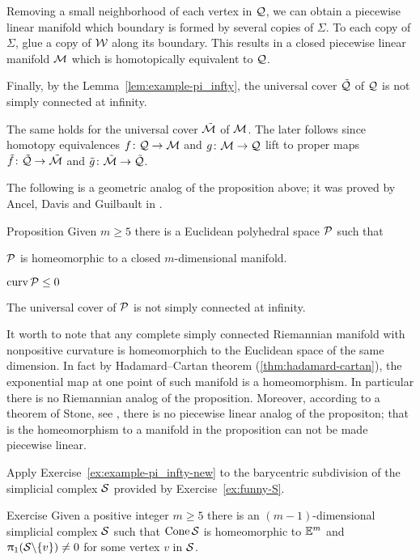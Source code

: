 Removing a small neighborhood of each vertex in $\mathcal{Q}$,
we can obtain a piecewise linear manifold 
which boundary is formed by several copies of $\Sigma$.
To each copy of $\Sigma$, 
glue a copy of  $\mathcal{W}$ along its boundary.
This results in a  closed piecewise linear manifold 
$\mathcal{M}$ which is homotopically equivalent to $\mathcal{Q}$.

Finally, by the Lemma~\ref{lem:example-pi_infty},  
the universal cover $\tilde{\mathcal{Q}}$ of $\mathcal{Q}$
is not simply connected at infinity.

The same holds for 
the universal cover $\tilde{\mathcal{M}}$ of $\mathcal{M}$.
The later follows since homotopy equivalences 
$f\: \spc Q\to \spc M$ and $g\:\spc M\to \spc Q$ 
lift to proper maps 
$\tilde f \: \tilde{\spc{Q}}\to \tilde{\spc{M}}$
and $\tilde g \: \tilde{\spc{M}}\to \tilde{\spc{Q}}$. 
\qeds

The following is a geometric analog of the proposition above;
it was proved by Ancel, Davis and Guilbault in \cite{ADG}. 


\begin{thm}{Proposition}\label{prop:loc-CAT-mnfld}
Given $m\ge 5$ there is a Euclidean polyhedral space $\mathcal{P}$ such that
\begin{subthm}{}
$\mathcal{P}$ is homeomorphic to a closed $m$-dimensional manifold.
\end{subthm}

\begin{subthm}{}
$\curv\spc{P}\le 0$
\end{subthm}

\begin{subthm}{}
The universal cover of $\mathcal{P}$ is not simply connected at infinity.
\end{subthm}
\end{thm}

It worth to note that any complete simply connected Riemannian manifold with nonpositive curvature is homeomorphich to the Euclidean space of the same dimension.
In fact by Hadamard--Cartan theorem
(\ref{thm:hadamard-cartan}), 
the exponential map at one point of such manifold is a homeomorphism.
In particular there is no Riemannian analog of the proposition.
Moreover, according to a theorem of Stone, see \cite{stone, davis-januszkiewicz}, there is no piecewise linear analog of the propositon; 
that is the homeomorphism to a manifold in the proposition can not be made piecewise linear. 

Apply Exercise~\ref{ex:example-pi_infty-new} to the barycentric subdivision of the simplicial complex $\mathcal{S}$ provided by Exercise~\ref{ex:funny-S}.
\qeds

\begin{thm}{Exercise}\label{ex:funny-S}
Given a positive integer $m\ge 5$
there is an $(m-1)$-dimensional simplicial complex $\mathcal{S}$ such that $\mathop{\rm Cone}\nolimits\mathcal{S}$ is homeomorphic to $\mathbb{E}^m$
and $\uppi_1(\mathcal{S}\backslash\{v\})\ne0$ for some vertex $v$ in $\mathcal{S}$.
\end{thm}


